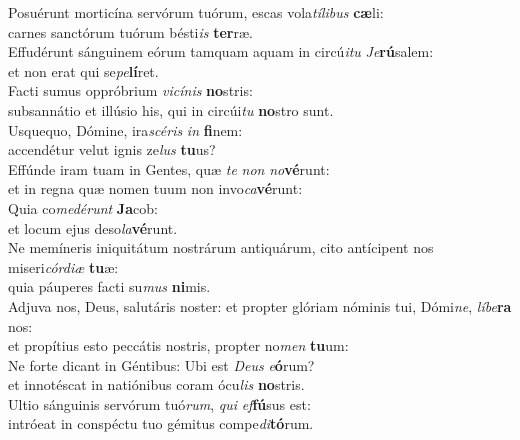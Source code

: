 \evenverse Posuérunt morticína servórum tuórum, escas vola\textit{tí}\textit{li}\textit{bus} \textbf{cæ}li:~\*\\
\evenverse carnes sanctórum tuórum bésti\textit{is} \textbf{ter}ræ.\\
\oddverse Effudérunt sánguinem eórum tamquam aquam in circú\textit{i}\textit{tu} \textit{Je}\textbf{rú}salem:~\*\\
\oddverse et non erat qui se\textit{pe}\textbf{lí}ret.\\
\evenverse Facti sumus oppróbrium \textit{vi}\textit{cí}\textit{nis} \textbf{no}stris:~\*\\
\evenverse subsannátio et illúsio his, qui in circúi\textit{tu} \textbf{no}stro sunt.\\
\oddverse Usquequo, Dómine, ira\textit{scé}\textit{ris} \textit{in} \textbf{fi}nem:~\*\\
\oddverse accendétur velut ignis ze\textit{lus} \textbf{tu}us?\\
\evenverse Effúnde iram tuam in Gentes, quæ \textit{te} \textit{non} \textit{no}\textbf{vé}runt:~\*\\
\evenverse et in regna quæ nomen tuum non invo\textit{ca}\textbf{vé}runt:\\
\oddverse Quia co\textit{me}\textit{dé}\textit{runt} \textbf{Ja}cob:~\*\\
\oddverse et locum ejus deso\textit{la}\textbf{vé}runt.\\
\evenverse Ne memíneris iniquitátum nostrárum antiquárum, cito antícipent nos miseri\textit{cór}\textit{di}\textit{æ} \textbf{tu}æ:~\*\\
\evenverse quia páuperes facti su\textit{mus} \textbf{ni}mis.\\
\oddverse Adjuva nos, Deus, salutáris noster: et propter glóriam nóminis tui, Dómi\textit{ne}, \textit{lí}\textit{be}\textbf{ra} nos:~\*\\
\oddverse et propítius esto peccátis nostris, propter no\textit{men} \textbf{tu}um:\\
\evenverse Ne forte dicant in Géntibus: Ubi est \textit{De}\textit{us} \textit{e}\textbf{ó}rum?~\*\\
\evenverse et innotéscat in natiónibus coram ócu\textit{lis} \textbf{no}stris.\\
\oddverse Ultio sánguinis servórum tuó\textit{rum}, \textit{qui} \textit{ef}\textbf{fú}sus est:~\*\\
\oddverse intróeat in conspéctu tuo gémitus compe\textit{di}\textbf{tó}rum.\\

